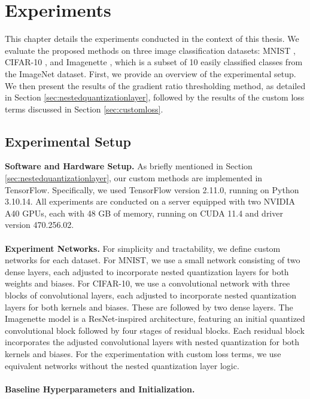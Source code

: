 \chapter{Experiments\label{cha:chapter4}}
This chapter details the experiments conducted in the context of this thesis.
We evaluate the proposed methods on three image classification datasets:
MNIST \cite{lecun2010mnist},
CIFAR-10 \cite{krizhevsky2009learning},
and Imagenette \cite{DBLP:journals/information/HowardG20}, which is a subset of 10 easily classified classes from the ImageNet dataset.
First, we provide an overview of the experimental setup.
We then present the results of the gradient ratio thresholding method, as detailed in Section \ref{sec:nestedquantizationlayer},
followed by the results of the custom loss terms discussed in Section \ref{sec:customloss}.


\section{Experimental Setup}
\label{sec:setup}
\textbf{Software and Hardware Setup.} As briefly mentioned in Section \ref{sec:nestedquantizationlayer},
our custom methods are implemented in TensorFlow.
Specifically, we used TensorFlow version 2.11.0, running on Python 3.10.14. 
All experiments are conducted on a server equipped with two NVIDIA A40 GPUs, 
each with 48 GB of memory, running on CUDA 11.4 and driver version 470.256.02.
\\
\\
\textbf{Experiment Networks.} 
For simplicity and tractability, we define custom networks for each dataset.
For MNIST, we use a small network consisting of two dense layers, 
each adjusted to incorporate nested quantization layers for both weights and biases. 
For CIFAR-10, we use a convolutional network with three blocks of convolutional layers, 
each adjusted to incorporate nested quantization layers for both kernels and biases.
These are followed by two dense layers.
The Imagenette model is a ResNet-inspired architecture,
featuring an initial quantized convolutional block followed by four stages of residual blocks. 
Each residual block incorporates the adjusted convolutional layers with nested quantization 
for both kernels and biases. For the experimentation with custom loss terms, 
we use equivalent networks without the nested quantization layer logic.
\\
\\
\textbf{Baseline Hyperparameters and Initialization.}


